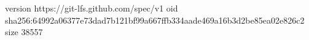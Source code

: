 version https://git-lfs.github.com/spec/v1
oid sha256:64992a06377e73dad7b121bf99a667ffb334aade469a16b3d2be85ea02e826c2
size 38557
